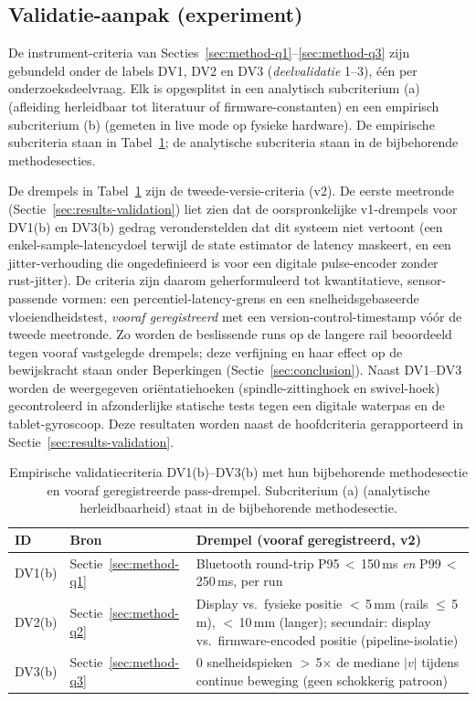 \documentclass[10pt, a4paper, twocolumn]{article}
\begin{document}
\subsection{Validatie-aanpak (experiment)}
\label{sec:method-validation}
De instrument-criteria van Secties~\ref{sec:method-q1}--\ref{sec:method-q3}
zijn gebundeld onder de labels DV1, DV2 en DV3 (\textit{deelvalidatie}
1--3), één per onderzoeksdeelvraag. Elk is opgesplitst in een
analytisch subcriterium (a) (afleiding herleidbaar tot literatuur of
firmware-constanten) en een empirisch subcriterium (b) (gemeten in live mode op
fysieke hardware). De empirische subcriteria staan in
Tabel~\ref{tab:validation-criteria}; de analytische subcriteria staan in de
bijbehorende methodesecties.

De drempels in Tabel~\ref{tab:validation-criteria} zijn de
tweede-versie-criteria (v2). De eerste meetronde
(Sectie~\ref{sec:results-validation}) liet zien dat de oorspronkelijke
v1-drempels voor DV1(b) en DV3(b) gedrag veronderstelden dat dit systeem niet
vertoont (een enkel-sample-latencydoel terwijl de state estimator de latency
maskeert, en een jitter-verhouding die ongedefinieerd is voor een digitale
pulse-encoder zonder rust-jitter). De criteria zijn daarom geherformuleerd tot
kwantitatieve, sensor-passende vormen: een percentiel-latency-grens en een
snelheidsgebaseerde vloeiendheidstest, \emph{vooraf geregistreerd} met een
version-control-timestamp vóór de tweede meetronde. Zo worden de beslissende runs
op de langere rail beoordeeld tegen vooraf vastgelegde drempels; deze verfijning
en haar effect op de bewijskracht staan onder Beperkingen
(Sectie~\ref{sec:conclusion}). Naast DV1--DV3 worden de weergegeven oriëntatiehoeken
(spindle-zittinghoek en swivel-hoek) gecontroleerd in afzonderlijke statische
tests tegen een digitale waterpas en de tablet-gyroscoop.
Deze resultaten worden naast de hoofdcriteria gerapporteerd in Sectie~\ref{sec:results-validation}.

\begin{table}[H]
\centering
\caption{Empirische validatiecriteria DV1(b)--DV3(b) met hun bijbehorende methodesectie en vooraf geregistreerde pass-drempel. Subcriterium (a) (analytische herleidbaarheid) staat in de bijbehorende methodesectie.}
\label{tab:validation-criteria}
\small
\begin{tabular}{@{}lp{1.7cm}p{3.8cm}@{}}
\toprule
\textbf{ID} & \textbf{Bron} & \textbf{Drempel (vooraf geregistreerd, v2)} \\
\midrule
DV1(b) & Sectie~\ref{sec:method-q1} & Bluetooth round-trip P95\,$<$\,150\,ms \emph{en} P99\,$<$\,250\,ms, per run \\
DV2(b) & Sectie~\ref{sec:method-q2} & Display vs.\ fysieke positie $<$\,5\,mm (rails $\leq$\,5\,m), $<$\,10\,mm (langer); secundair: display vs.\ firmware-encoded positie (pipeline-isolatie) \\
DV3(b) & Sectie~\ref{sec:method-q3} & 0 snelheidspieken $>$\,5$\times$ de mediane $|v|$ tijdens continue beweging (geen schokkerig patroon) \\
\bottomrule
\end{tabular}
\end{table}
\end{document}
